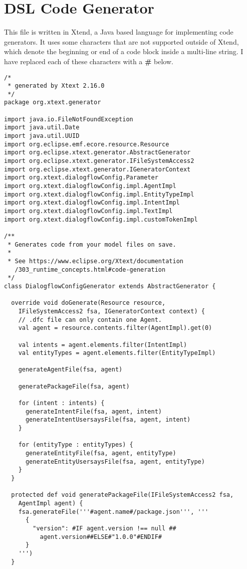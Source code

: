 \chapter{DSL Code Generator}
\label{CodeGenerator}
This file is written in Xtend, a Java based language for implementing code generators. It uses some characters that are not supported outside of Xtend, which denote the beginning or end of a code block inside a multi-line string. I have replaced each of these characters with a \textbf{\#} below.

\begin{lstlisting}
/*
 * generated by Xtext 2.16.0
 */
package org.xtext.generator

import java.io.FileNotFoundException
import java.util.Date
import java.util.UUID
import org.eclipse.emf.ecore.resource.Resource
import org.eclipse.xtext.generator.AbstractGenerator
import org.eclipse.xtext.generator.IFileSystemAccess2
import org.eclipse.xtext.generator.IGeneratorContext
import org.xtext.dialogflowConfig.Parameter
import org.xtext.dialogflowConfig.impl.AgentImpl
import org.xtext.dialogflowConfig.impl.EntityTypeImpl
import org.xtext.dialogflowConfig.impl.IntentImpl
import org.xtext.dialogflowConfig.impl.TextImpl
import org.xtext.dialogflowConfig.impl.customTokenImpl

/**
 * Generates code from your model files on save.
 * 
 * See https://www.eclipse.org/Xtext/documentation
   /303_runtime_concepts.html#code-generation
 */
class DialogflowConfigGenerator extends AbstractGenerator {

  override void doGenerate(Resource resource, 
    IFileSystemAccess2 fsa, IGeneratorContext context) {
    // .dfc file can only contain one Agent.
    val agent = resource.contents.filter(AgentImpl).get(0)

    val intents = agent.elements.filter(IntentImpl)
    val entityTypes = agent.elements.filter(EntityTypeImpl)

    generateAgentFile(fsa, agent)

    generatePackageFile(fsa, agent)

    for (intent : intents) {
      generateIntentFile(fsa, agent, intent)
      generateIntentUsersaysFile(fsa, agent, intent)
    }

    for (entityType : entityTypes) {
      generateEntityFile(fsa, agent, entityType)
      generateEntityUsersaysFile(fsa, agent, entityType)
    }
  }

  protected def void generatePackageFile(IFileSystemAccess2 fsa, 
    AgentImpl agent) {
    fsa.generateFile('''#agent.name#/package.json''', '''
      {
        "version": #IF agent.version !== null ##
          agent.version##ELSE#"1.0.0"#ENDIF#
      }
    ''')
  }


\end{lstlisting}
